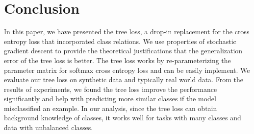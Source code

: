 \documentclass[twoside]{article}
\theoremstyle{definition}
\begin{document}
\section{Conclusion}
In this paper, we have presented the tree loss, a drop-in replacement for the cross entropy loss that incorporated class relations. 
We use properties of stochastic gradient descent to provide the theoretical justifications that the generalization error of the tree loss is better. 
The tree loss works by re-parameterizing the parameter matrix for softmax cross entropy loss and can be easily implement. 
We evaluate our tree loss on synthetic data and typically real world data. 
From the results of experiments, we found the tree loss improve the performance significantly and  help with predicting more similar classes if the model misclassified an example. 
In our analysis, since the tree loss can obtain background knowledge of classes, it works well for tasks with many classes and data with unbalanced classes. 








\end{document}
